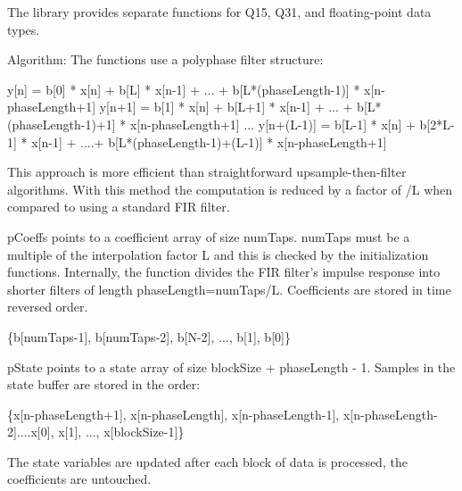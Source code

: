 The library provides separate functions for Q15, Q31, and floating-\/point data types.

\begin{DoxyParagraph}{Algorithm\-: }
The functions use a polyphase filter structure\-: 
\begin{DoxyPre}    
   y[n] = b[0] * x[n] + b[L]   * x[n-1] + ... + b[L*(phaseLength-1)] * x[n-phaseLength+1]    
   y[n+1] = b[1] * x[n] + b[L+1] * x[n-1] + ... + b[L*(phaseLength-1)+1] * x[n-phaseLength+1]    
   ...    
   y[n+(L-1)] = b[L-1] * x[n] + b[2*L-1] * x[n-1] + ....+ b[L*(phaseLength-1)+(L-1)] * x[n-phaseLength+1]    
\end{DoxyPre}
 This approach is more efficient than straightforward upsample-\/then-\/filter algorithms. With this method the computation is reduced by a factor of {/\-L} when compared to using a standard F\-I\-R filter. 
\end{DoxyParagraph}
\begin{DoxyParagraph}{}
{\ttfamily p\-Coeffs} points to a coefficient array of size {\ttfamily num\-Taps}. {\ttfamily num\-Taps} must be a multiple of the interpolation factor {\ttfamily L} and this is checked by the initialization functions. Internally, the function divides the F\-I\-R filter's impulse response into shorter filters of length {\ttfamily phase\-Length=num\-Taps/\-L}. Coefficients are stored in time reversed order. 
\end{DoxyParagraph}
\begin{DoxyParagraph}{}

\begin{DoxyPre}    
   \{b[numTaps-1], b[numTaps-2], b[N-2], ..., b[1], b[0]\}    
\end{DoxyPre}
 
\end{DoxyParagraph}
\begin{DoxyParagraph}{}
{\ttfamily p\-State} points to a state array of size {\ttfamily block\-Size + phase\-Length -\/ 1}. Samples in the state buffer are stored in the order\-: 
\end{DoxyParagraph}
\begin{DoxyParagraph}{}

\begin{DoxyPre}    
   \{x[n-phaseLength+1], x[n-phaseLength], x[n-phaseLength-1], x[n-phaseLength-2]....x[0], x[1], ..., x[blockSize-1]\}    
\end{DoxyPre}
 The state variables are updated after each block of data is processed, the coefficients are untouched.
\end{DoxyParagraph}
